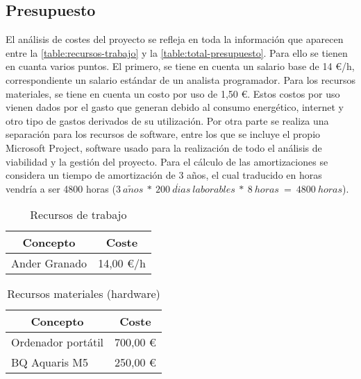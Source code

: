 \subsection{Presupuesto}
El análisis de costes del proyecto se refleja en toda la información que aparecen entre la \autoref{table:recursos-trabajo} y la \autoref{table:total-presupuesto}. Para ello se tienen en cuanta varios puntos. El primero, se tiene en cuenta un salario base de 14 \euro/h, correspondiente un salario estándar de un analista programador.
Para los recursos materiales, se tiene en cuenta un costo por uso de 1,50 \euro. Estos costos por uso vienen dados por el gasto que generan debido al consumo energético, internet y otro tipo de gastos derivados de su utilización. Por otra parte se realiza una separación para los recursos de software, entre los que se incluye el propio Microsoft Project, software usado para la realización de todo el análisis de viabilidad y la gestión del proyecto.
Para el cálculo de las amortizaciones se considera un tiempo de amortización de 3 años, el cual traducido en horas vendría a ser 4800 horas ($3\ a\tilde{n}os\ *\ 200\ d\acute{i}as\ laborables\ *\ 8\ horas\ =\ 4800\ horas$).

\begin{table}[H]
	\centering
	\begin{tabular}{ |l|r| } 
		\hline
		\multicolumn{1}{|c|}{Concepto} & 
			\multicolumn{1}{|c|}{Coste} \\
		\hline
		Ander Granado & 14,00 \euro/h \\
		\hline
	\end{tabular}
	\caption{Recursos de trabajo}
	\label{table:recursos-trabajo}
\end{table}

\begin{table}[H]
	\centering
	\begin{tabular}{ |l|r| } 
		\hline
		\multicolumn{1}{|c|}{Concepto} & 
			\multicolumn{1}{|c|}{Coste} \\
		\hline
		Ordenador portátil 	& 700,00 \euro \\
		BQ Aquaris M5 		& 250,00 \euro \\
		\hline
	\end{tabular}
	\caption{Recursos materiales (hardware)}
	\label{table:recursos-materiales}
\end{table}

